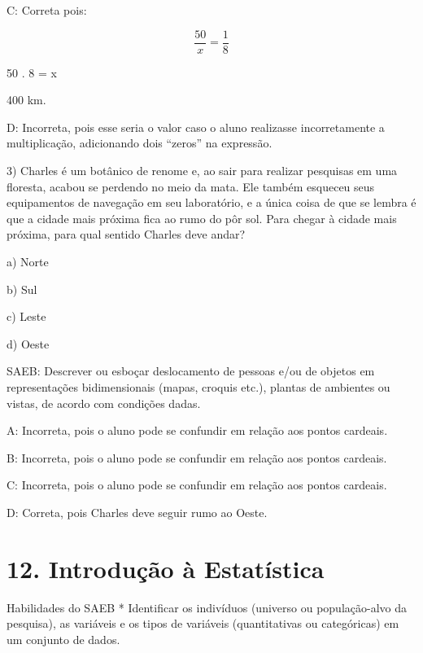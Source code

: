 C: Correta pois:

\[\frac {50}{x} = \frac {1}{8}\]

50 . 8 = x

400 km.

D: Incorreta, pois esse seria o valor caso o aluno realizasse
incorretamente a multiplicação, adicionando dois ``zeros'' na expressão.

3) Charles é um botânico de renome e, ao sair para realizar pesquisas em
uma floresta, acabou se perdendo no meio da mata. Ele também esqueceu
seus equipamentos de navegação em seu laboratório, e a única coisa de
que se lembra é que a cidade mais próxima fica ao rumo do pôr sol. Para
chegar à cidade mais próxima, para qual sentido Charles deve andar?

a) Norte

b) Sul

c) Leste

d) Oeste

SAEB: Descrever ou esboçar deslocamento de pessoas e/ou de objetos em
representações bidimensionais (mapas, croquis etc.), plantas de
ambientes ou vistas, de acordo com condições dadas.

A: Incorreta, pois o aluno pode se confundir em relação aos pontos
cardeais.

B: Incorreta, pois o aluno pode se confundir em relação aos pontos
cardeais.

C: Incorreta, pois o aluno pode se confundir em relação aos pontos
cardeais.

D: Correta, pois Charles deve seguir rumo ao Oeste.


\section{12. Introdução à
Estatística}

Habilidades do SAEB * Identificar os indivíduos (universo ou
população-alvo da pesquisa), as variáveis e os tipos de variáveis
(quantitativas ou categóricas) em um conjunto de dados.

